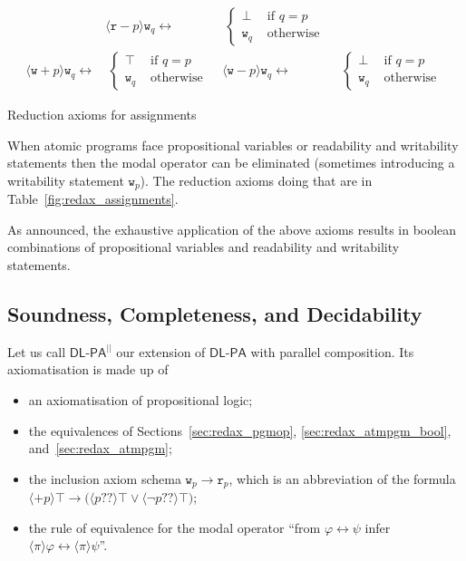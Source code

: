 \documentclass{llncs}
\newcommand{\pll}{ {||} }							%
\newcommand{\readable}[1]{\mathtt{r}_{#1}}
\newcommand{\writable}[1]{\mathtt{w}_{#1}}
\newcommand{\testendo}{?\!\!?}			%
\newcommand{\Dlpa}{\ensuremath{\mathsf{DL\text{-}PA}}\xspace}
\newcommand{\DlpaPll}{\ensuremath{\mathsf{DL\text{-}PA}^\pll}\xspace}
\newcommand{\assgnbotR}[1]{{\mathtt r {-} #1}}
\newcommand{\assgntopW}[1]{{\mathtt w {+} #1}}
\newcommand{\assgnbotW}[1]{{\mathtt w {-} #1}}
\newcommand{\assgntopV}[1]{{\mathtt {+} #1}}
\newcommand{\assgnbotV}[1]{{\mathtt {-} #1}}
\newcommand{\ldia}[1]{ \big\langle #1 \big\rangle}
\newcommand{\leqv}{ \leftrightarrow }
\newcommand{\limp}{ \rightarrow }
\renewcommand{\phi}{\varphi}
\begin{document}
\begin{table}[t]
\begin{align*}
& \ldia{\assgnbotR p } \writable{q} \leqv &\ \begin{cases}
                \bot & \text{ if } q = p \\
                \writable{q} & \text{ otherwise } 
								\end{cases}
\\
\ldia{\assgntopW p } \writable{q} \leqv &\ \begin{cases}
								\top & \text{ if } q = p \\
								\writable{q} & \text{ otherwise }
								\end{cases}
& \ldia{\assgnbotW p } \writable{q} \leqv &\ \begin{cases}
								\bot & \text{ if } q = p \\
								\writable{q} & \text{ otherwise }
								\end{cases}
\end{align*}
\caption{Reduction axioms for assignments
\label{fig:redax_assignments}
}
\end{table}

When atomic programs face propositional variables or readability and writability statements 
then the modal operator can be eliminated (sometimes introducing a writability statement $\writable{p}$). 
The reduction axioms doing that are in Table~\ref{fig:redax_assignments}.

As announced, the exhaustive application of the above axioms
results in boolean combinations of propositional variables and readability and writability statements. 

\subsection{Soundness, Completeness, and Decidability} 

Let us call \DlpaPll our extension of \Dlpa with parallel composition. 
Its axiomatisation is made up of 
\begin{itemize}
\item
an axiomatisation of propositional logic;
\item
the equivalences of Sections~\ref{sec:redax_pgmop}, 
\ref{sec:redax_atmpgm_bool}, 
and~\ref{sec:redax_atmpgm};
\item
the inclusion axiom schema $\writable{p} \limp \readable p$, which is an abbreviation of the formula
$\ldia{ \assgntopV p } \top \limp \big( \ldia{ p \testendo} \top \lor \ldia{ \lnot p \testendo} \top \big) $;
\item
the rule of equivalence for the modal operator %
``from $\phi \leqv \psi$ infer $\ldia \pi \phi \leqv \ldia \pi \psi $''.
\end{itemize}
\end{document}
